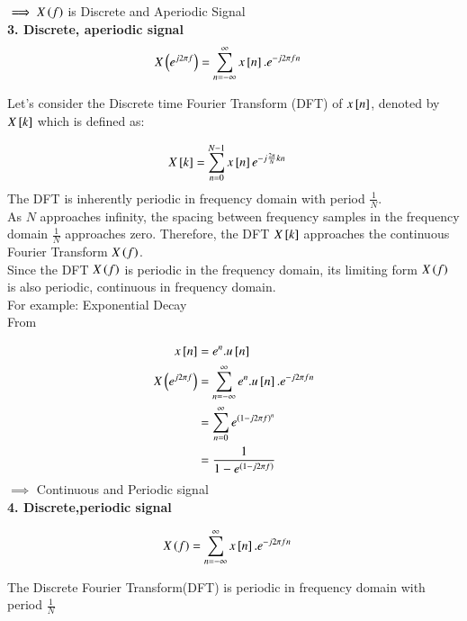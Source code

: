 \documentclass[journal,12pt,onecolumn]{IEEEtran}
\theoremstyle{remark}
\begin{document}
$\implies X\left(f\right)$ is Discrete and Aperiodic Signal\\


\textbf{3. Discrete, aperiodic signal}\\

\begin{align}
X\left(e^{j2\pi f}\right)&= \sum_{n=-\infty}^{\infty} x{}\left[n\right].e^{-j2\pi fn}
\end{align}


Let's consider the Discrete time Fourier Transform (DFT) of $x{}\left[n\right]$, denoted by $ X{}\left[k\right]$ which is defined as:

\begin{align}
X{}\left[k\right]&=\sum_{n=0}^{N-1}x{}\left[n\right]e^{-j\frac{2\pi}{N}kn}
\end{align}
The DFT is inherently periodic in frequency domain with period $\frac{1}{N}$.\\


As  $N$ approaches infinity, the spacing between frequency samples in the frequency domain  $\frac{1}{N}$  approaches zero. Therefore, the DFT $X{}\left[k\right]$ approaches the continuous Fourier Transform $X\left(f\right)$. \\

Since the DFT $X\left(f\right)$  is periodic in the frequency domain, its limiting form $X\left(f\right)$ is also periodic, continuous in frequency domain.\\

For example: Exponential Decay\\

From 

\begin{align}
x{}\left[n\right]&= e^{n}.u{}\left[n\right]\\
X\left(e^{j2\pi f}\right)&= \sum_{n=-\infty}^{\infty} e^{n}.u{}\left[n\right].e^{-j2\pi fn}\\
&=  \sum_{n=0}^{\infty} e^{\left(1-j2\pi f\right)^{n}}\\
&=\frac{1}{1-e^{\left(1-j2\pi f\right)}}
\end{align}
$\implies $ Continuous and Periodic signal\\

\vspace{2mm}
\textbf{4. Discrete,periodic signal}

\begin{align}
X\left(f\right)&= \sum_{n=-\infty}^{\infty} x{}\left[n\right].e^{-j2\pi fn}
\end{align}

The Discrete Fourier Transform(DFT) is periodic in frequency domain with period $\frac{1}{N}$\\
\end{document}
